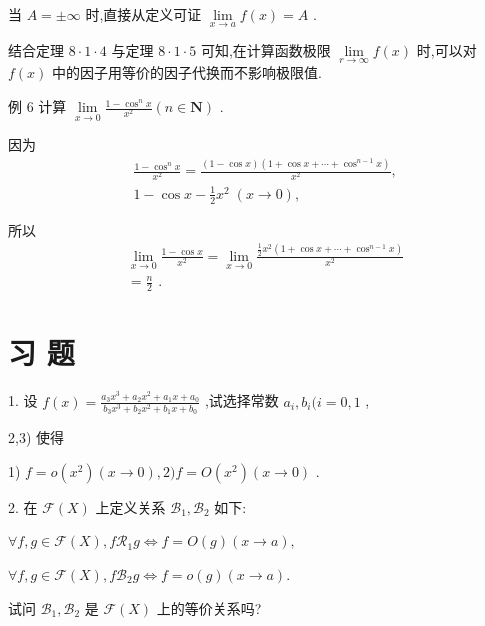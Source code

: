 当 $A =  \pm  \infty$ 时,直接从定义可证 $\mathop{\lim }\limits_{{x \rightarrow  a}}f\left( x\right)  = A$ .

结合定理 $8 \cdot  1 \cdot  4$ 与定理 $8 \cdot  1 \cdot  5$ 可知,在计算函数极限 $\mathop{\lim }\limits_{{r \rightarrow  \infty }}f\left( x\right)$ 时,可以对 $f\left( x\right)$ 中的因子用等价的因子代换而不影响极限值.

例 6 计算 $\mathop{\lim }\limits_{{x \rightarrow  0}}\frac{1 - {\cos }^{n}x}{{x}^{2}}\left( {n \in  \mathbf{N}}\right)$ .

因为
\begin{align*}
	&\frac{1 - {\cos }^{n}x}{{x}^{2}} = \frac{\left( {1 - \cos x}\right) \left( {1 + \cos x + \cdots  + {\cos }^{n - 1}x}\right) }{{x}^{2}},\\
	&1 - \cos x - \frac{1}{2}{x}^{2}\;\left( {x \rightarrow  0}\right) ,
\end{align*}

所以
\begin{align*}
	&\mathop{\lim }\limits_{{x \rightarrow  0}}\frac{1 - \cos x}{{x}^{2}} = \mathop{\lim }\limits_{{x \rightarrow  0}}\frac{\frac{1}{2}{x}^{2}\left( {1 + \cos x + \cdots  + {\cos }^{n - 1}x}\right) }{{x}^{2}}\\
	&= \frac{n}{2}\text{ . }
\end{align*}

\section*{习 题}

1. 设 $f\left( x\right)  = \frac{{a}_{3}{x}^{3} + {a}_{2}{x}^{2} + {a}_{1}x + {a}_{0}}{{b}_{3}{x}^{3} + {b}_{2}{x}^{2} + {b}_{1}x + {b}_{0}}$ ,试选择常数 ${a}_{i},{b}_{i}(i = 0,1$ ,

2,3) 使得

1) $f = o\left( {x}^{2}\right) \left( {x \rightarrow  0}\right) ,2)f = O\left( {x}^{2}\right) \left( {x \rightarrow  0}\right)$ .

2. 在 $\mathcal{F}\left( X\right)$ 上定义关系 ${\mathcal{B}}_{1},{\mathcal{B}}_{2}$ 如下:

$\forall f,g \in  \mathcal{F}\left( X\right) ,f{\mathcal{R}}_{1}g \Leftrightarrow  f = O\left( g\right) \left( {x \rightarrow  a}\right) ,$

$\forall f,g \in  \mathcal{F}\left( X\right) ,f{\mathcal{B}}_{2}g \Leftrightarrow  f = o\left( g\right) \left( {x \rightarrow  a}\right) .$

试问 ${\mathcal{B}}_{1},{\mathcal{B}}_{2}$ 是 $\mathcal{F}\left( X\right)$ 上的等价关系吗?

